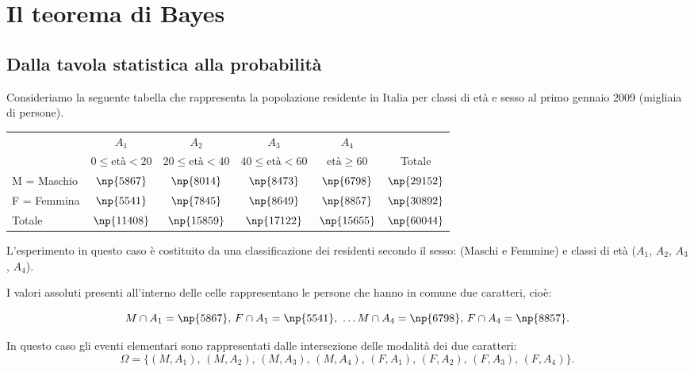 \chapter{Il teorema di Bayes}

\section{Dalla tavola statistica alla probabilità}

Consideriamo la seguente tabella che rappresenta la popolazione
residente in Italia per classi di età e sesso al primo gennaio 2009
(migliaia di persone).

\begin{center}
\begin{tabular}{lccccc}
& $ A_1 $
& $ A_2 $
& $ A_3 $
& $ A_4 $
& \\

& $ 0\le \text{età}<20 $
& $ 20\le \text{età}<40 $
& $ 40\le \text{età}<60 $
& $ \text{età}\ge 60 $
& Totale\\

M = Maschio & $ \np{5867} $ & $ \np{8014} $ & $ \np{8473} $ & $ \np{6798} $ & $ \np{29152} $ \\
F = Femmina & $ \np{5541} $ & $ \np{7845} $ & $ \np{8649} $ & $ \np{8857} $ & $ \np{30892} $ \\

Totale & $ \np{11408} $ & $ \np{15859} $ & $ \np{17122} $ & $ \np{15655} $ & $ \np{60044} $ %
\end{tabular}
\end{center}

L'esperimento in questo caso è costituito da una
classificazione dei residenti secondo il sesso: (Maschi e Femmine) e
classi di età ($ A_1 $, $ A_2 $, $ A_3 $, $ A_4 $).

I valori assoluti presenti
all'interno delle celle rappresentano le persone che
hanno in comune  due caratteri, cioè:

\[M\cap A_{1}=\np{5867}\text{, }F\cap A_{1}=\np{5541}\text{, }\ldots M\cap A_{4}=\np{6798}\text{, }F\cap A_{4}=\np{8857}.\]

In questo caso gli eventi elementari sono rappresentati dalle
intersezione delle modalità dei due caratteri:
\[\Omega=\{(M,A_{1})\text{, }(M,A_{2})\text{, }(M,A_{3})\text{, }(M,A_{4})\text{, }(F,A_{1})\text{, }(F,A_{2})\text{, }(F,A_{3})\text{, }(F,A_{4})\}.\]

